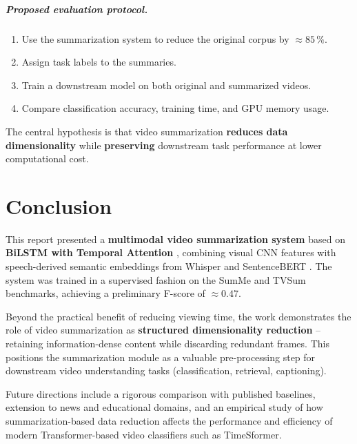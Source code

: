 \documentclass[12pt, a4paper]{report}
\begin{document}
\paragraph{Proposed evaluation protocol.}
\begin{enumerate}
  \item Use the summarization system to reduce the original corpus by $\approx 85\,\%$.
  \item Assign task labels to the summaries.
  \item Train a downstream model on both original and summarized videos.
  \item Compare classification accuracy, training time, and GPU memory usage.
\end{enumerate}

The central hypothesis is that video summarization \textbf{reduces data dimensionality}
while \textbf{preserving} downstream task performance at lower computational cost.

\chapter{Conclusion}

This report presented a \textbf{multimodal video summarization system} based on
\textbf{BiLSTM with Temporal Attention} \cite{zhang2016}, combining visual CNN features
with speech-derived semantic embeddings from Whisper \cite{radford2023} and SentenceBERT
\cite{reimers2019}. The system was trained in a supervised fashion on the SumMe
\cite{gygli2014} and TVSum \cite{song2015} benchmarks, achieving a preliminary F-score
of $\approx 0.47$.

Beyond the practical benefit of reducing viewing time, the work demonstrates the role
of video summarization as \textbf{structured dimensionality reduction} -- retaining
information-dense content while discarding redundant frames. This positions the
summarization module as a valuable pre-processing step for downstream video
understanding tasks (classification, retrieval, captioning).

Future directions include a rigorous comparison with published baselines, extension to
news and educational domains, and an empirical study of how summarization-based data
reduction affects the performance and efficiency of modern Transformer-based video
classifiers such as TimeSformer.
\end{document}
